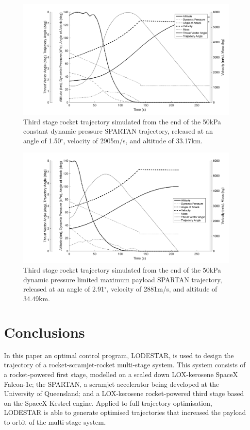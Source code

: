 \documentclass[journal]{new-aiaa}
\newcommand{\SeparationAltConstq}{33.17}
\newcommand{\SeparationAltFiftykPa}{34.49}
\newcommand{\SeparationvConstq}{2905}
\newcommand{\SeparationvFiftykPa}{2881}
\newcommand{\SeparationAngleConstq}{1.50}
\newcommand{\SeparationAngleFiftykPa}{2.91}
\begin{document}
\begin{figure}[H]
	\centering
	\includegraphics[width=0.8\linewidth]{ThirdStageConstQ}
	\caption{Third stage rocket trajectory simulated from the end of the 50kPa constant dynamic pressure SPARTAN trajectory, released at an angle of \SeparationAngleConstq $^\circ$, velocity of \SeparationvConstq m/s, and altitude of \SeparationAltConstq km.}
	\label{fig:ThirdStageConstQ}
\end{figure}
\begin{figure}[H]

	\centering
	\includegraphics[width=0.8\linewidth]{ThirdStage50kpaConstrained}
	\caption{Third stage rocket trajectory simulated from the end of the 50kPa dynamic pressure limited maximum payload SPARTAN trajectory, released at an angle of \SeparationAngleFiftykPa $^\circ$, velocity of \SeparationvFiftykPa m/s, and altitude of \SeparationAltFiftykPa km.}
	\label{fig:ThirdStage50kPa}
\end{figure}

\section{Conclusions}


In this paper an optimal control program, LODESTAR, is used to design the trajectory of a rocket-scramjet-rocket multi-stage system. This system consists of a rocket-powered first stage, modelled on a scaled down LOX-kerosene SpaceX Falcon-1e; the SPARTAN, a scramjet accelerator being developed at the University of Queensland; and a LOX-kerosene rocket-powered third stage based on the SpaceX Kestrel engine. Applied to full trajectory optimisation, LODESTAR is able to generate optimised trajectories that increased the payload to orbit of the multi-stage system.
\end{document}
